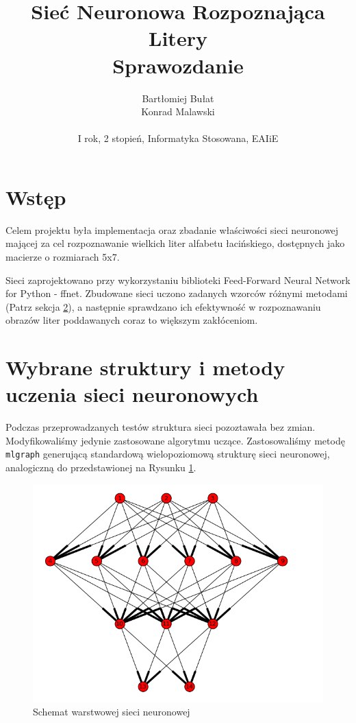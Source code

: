 \documentclass[a4paper]{article}
\title{Sieć Neuronowa Rozpoznająca Litery \\ Sprawozdanie}
\author{
Bartłomiej Bułat\\
Konrad Malawski\\
\\
I rok, 2 stopień, Informatyka Stosowana, EAIiE}
\begin{document}
\maketitle

\newpage
\section{Wstęp}

Celem projektu była implementacja oraz zbadanie właściwości sieci 
neuronowej mającej za cel rozpoznawanie wielkich liter alfabetu łacińskiego,
dostępnych jako macierze o rozmiarach 5x7. 

Sieci zaprojektowano przy wykorzystaniu biblioteki 
Feed-Forward Neural Network for Python - ffnet. 
Zbudowane sieci uczono zadanych wzorców różnymi 
metodami (Patrz sekcja \ref{sec:metody}), a następnie sprawdzano ich efektywność w rozpoznawaniu obrazów liter poddawanych coraz to większym zakłóceniom.

\section{Wybrane struktury i metody uczenia sieci
neuronowych}\label{sec:metody}

Podczas przeprowadzanych testów struktura sieci pozoztawała bez zmian.
Modyfikowaliśmy jedynie zastosowane algorytmu uczące. Zastosowaliśmy metodę
\verb|mlgraph| generującą standardową wielopoziomową strukturę sieci 
neuronowej, analogiczną do przedstawionej na Rysunku \ref{rys:graf}.

\begin{figure}[pht]
 \centering
 \includegraphics[scale=0.34]{mlgraph}
 \caption{Schemat warstwowej sieci neuronowej}\label{rys:graf}
\end{figure}
\end{document}
